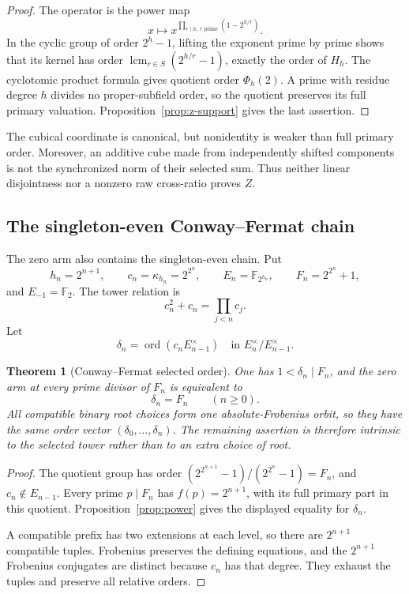 \documentclass[11pt]{article}
\newtheorem{theorem}{Theorem}[section]
\theoremstyle{definition}
\theoremstyle{remark}
\begin{document}
\begin{proof}
The operator is the power map
\[
  x\longmapsto x^{\prod_{r\mid h,\ r\text{ prime}}(1-2^{h/r})}.
\]
In the cyclic group of order $2^h-1$, lifting the exponent prime by prime
shows that its kernel has order
$\operatorname{lcm}_{r\in S}(2^{h/r}-1)$, exactly the order of $H_h$.
The cyclotomic product formula gives quotient order $\Phi_h(2)$.  A prime
with residue degree $h$ divides no proper-subfield order, so the quotient
preserves its full primary valuation.  Proposition~\ref{prop:z-support}
gives the last assertion.
\end{proof}

The cubical coordinate is canonical, but nonidentity is weaker than full
primary order.  Moreover, an additive cube made from independently shifted
components is not the synchronized norm of their selected sum.  Thus neither
linear disjointness nor a nonzero raw cross-ratio proves $Z$.

\subsection{The singleton-even Conway--Fermat chain}

The zero arm also contains the singleton-even chain.  Put
\[
 h_n=2^{n+1},\qquad c_n=\kappa_{h_n}=2^{2^n},\qquad
 E_n=\mathbb F_{2^{h_n}},\qquad F_n=2^{2^n}+1,
\]
and $E_{-1}=\mathbb F_2$.  The tower relation is
\[
 c_n^2+c_n=\prod_{j<n}c_j.
\]
Let
\[
 \delta_n=\operatorname{ord}
   (c_nE_{n-1}^{\times})
 \quad\text{in }E_n^{\times}/E_{n-1}^{\times}.
\]

\begin{theorem}[Conway--Fermat selected order]\label{thm:fermat}
One has $1<\delta_n\mid F_n$, and the zero arm at every prime divisor of
$F_n$ is equivalent to
\[
  \delta_n=F_n\qquad(n\geq0).
\]
All compatible binary root choices form one absolute-Frobenius orbit, so
they have the same order vector $(\delta_0,\ldots,\delta_n)$.  The remaining
assertion is therefore intrinsic to the selected tower rather than to an
extra choice of root.
\end{theorem}

\begin{proof}
The quotient group has order
$(2^{2^{n+1}}-1)/(2^{2^n}-1)=F_n$, and $c_n\notin E_{n-1}$.  Every prime
$p\mid F_n$ has $f(p)=2^{n+1}$, with its full primary part in this quotient.
Proposition~\ref{prop:power} gives the displayed equality for $\delta_n$.

A compatible prefix has two extensions at each level, so there are
$2^{n+1}$ compatible tuples.  Frobenius preserves the defining equations,
and the $2^{n+1}$ Frobenius conjugates are distinct because $c_n$ has that
degree.  They exhaust the tuples and preserve all relative orders.
\end{proof}
\end{document}
